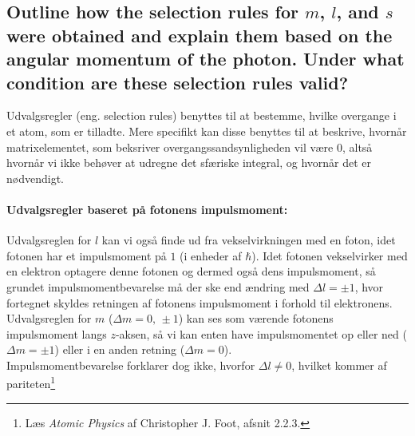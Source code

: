 \subsection{Outline how the selection rules for $m$, $l$, and $s$ were obtained and explain them based on the angular momentum of the photon. Under what condition are these selection rules valid?}


Udvalgsregler (eng. selection rules) benyttes til at bestemme, hvilke overgange i et atom, som er tilladte. Mere specifikt kan disse benyttes til at beskrive, hvornår matrixelementet, som beksriver overgangssandsynligheden vil være 0, altså hvornår vi ikke behøver at udregne det sfæriske integral, og hvornår det er nødvendigt.\\


\paragraph{Udvalgsregler baseret på fotonens impulsmoment:} Udvalgsreglen for $l$ kan vi også finde ud fra vekselvirkningen med en foton, idet fotonen har et impulsmoment på $1$ (i enheder af $\hbar$). Idet fotonen vekselvirker med en elektron optagere denne fotonen og dermed også dens impulsmoment, så grundet impulsmomentbevarelse må der ske end ændring med $\Delta l = \pm 1$, hvor fortegnet skyldes retningen af fotonens impulsmoment i forhold til elektronens.\\
Udvalgsreglen for $m$ ($\Delta m = 0,\, \pm 1$) kan ses som værende fotonens impulsmoment langs $z$-aksen, så vi kan enten have impulsmomentet op eller ned ($\Delta m = \pm 1$) eller i en anden retning ($\Delta m = 0$).\\
Impulsmomentbevarelse forklarer dog ikke, hvorfor $\Delta l \ne 0$, hvilket kommer af pariteten\footnote{Læs \textit{Atomic Physics} af Christopher J. Foot, afsnit 2.2.3.}



